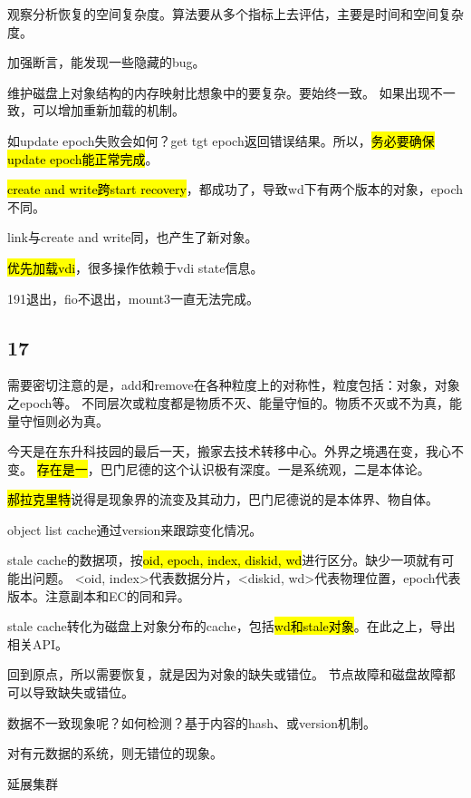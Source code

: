 观察分析恢复的空间复杂度。算法要从多个指标上去评估，主要是时间和空间复杂度。

加强断言，能发现一些隐藏的bug。

维护磁盘上对象结构的内存映射比想象中的要复杂。要始终一致。
如果出现不一致，可以增加重新加载的机制。
\begin{enumbox}
\item 如update epoch失败会如何？get tgt epoch返回错误结果。所以，\hl{务必要确保update epoch能正常完成}。
\item \hl{create and write跨start recovery}，都成功了，导致wd下有两个版本的对象，epoch不同。
\item link与create and write同，也产生了新对象。
\item \hl{优先加载vdi}，很多操作依赖于vdi state信息。
\item 191退出，fio不退出，mount3一直无法完成。
\end{enumbox}

\subsection{17}

需要密切注意的是，add和remove在各种粒度上的对称性，粒度包括：对象，对象之epoch等。
不同层次或粒度都是物质不灭、能量守恒的。物质不灭或不为真，能量守恒则必为真。

今天是在东升科技园的最后一天，搬家去技术转移中心。外界之境遇在变，我心不变。
\hl{存在是一}，巴门尼德的这个认识极有深度。一是系统观，二是本体论。

\hl{郝拉克里特}说得是现象界的流变及其动力，巴门尼德说的是本体界、物自体。

object list cache通过version来跟踪变化情况。

stale cache的数据项，按\hl{oid, epoch, index, diskid, wd}进行区分。缺少一项就有可能出问题。
<oid, index>代表数据分片，<diskid, wd>代表物理位置，epoch代表版本。注意副本和EC的同和异。

stale cache转化为磁盘上对象分布的cache，包括\hl{wd和stale对象}。在此之上，导出相关API。

\hrulefill

回到原点，所以需要恢复，就是因为对象的缺失或错位。
节点故障和磁盘故障都可以导致缺失或错位。

数据不一致现象呢？如何检测？基于内容的hash、或version机制。

对有元数据的系统，则无错位的现象。

\hrulefill

延展集群

